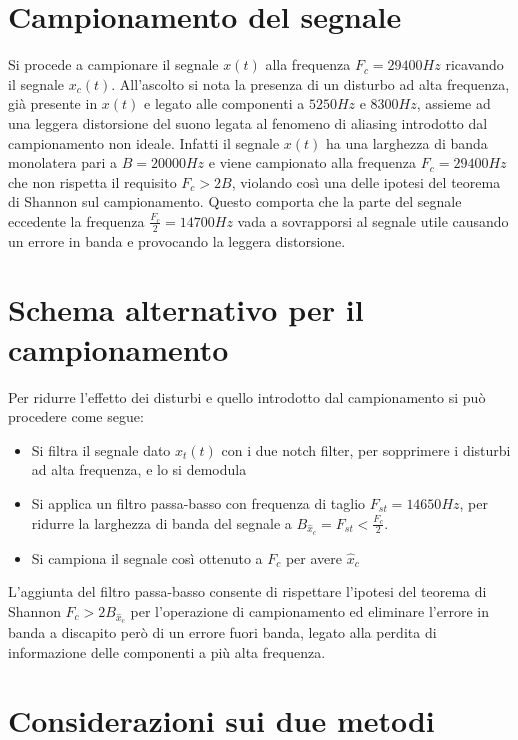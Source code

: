 \documentclass[12pt]{article}
\begin{document}
\section{Campionamento del segnale}

Si procede a campionare il segnale $x(t)$ alla frequenza $F_{c} = 29400Hz$ ricavando il segnale $x_{c}(t)$. All'ascolto si nota la presenza di un disturbo ad alta frequenza, già presente in $x(t)$ e legato alle componenti a $5250Hz$ e $8300Hz$, assieme ad una leggera distorsione del suono legata al fenomeno di aliasing introdotto dal campionamento non ideale. Infatti il segnale $x(t)$ ha una larghezza di banda monolatera pari a $B = 20000Hz$ e viene campionato alla frequenza $F_{c} = 29400Hz$ che non rispetta il requisito $F_{c} > 2B$, violando così una delle ipotesi del teorema di Shannon sul campionamento. Questo comporta che la parte del segnale eccedente la frequenza $\frac{F_{c}}{2} = 14700Hz$ vada a sovrapporsi al segnale utile causando un errore in banda e provocando la leggera distorsione.

\section{Schema alternativo per il campionamento}

Per ridurre l'effetto dei disturbi e quello introdotto dal campionamento si può procedere come segue: 
\begin{itemize}
	\item Si filtra il segnale dato $x_{t}(t)$ con i due notch filter, per sopprimere i disturbi ad alta frequenza, e lo si demodula 
	\item Si applica un filtro passa-basso con frequenza di taglio $F_{st} = 14650Hz$, per ridurre la larghezza di banda del segnale a $B_{\hat{x}_{c}} = F_{st} < \frac{F_{c}}{2}$.  
	\item Si campiona il segnale così ottenuto a $F_{c}$ per avere $\hat{x}_{c}$
\end{itemize}

L'aggiunta del filtro passa-basso consente di rispettare l'ipotesi del teorema di Shannon $F_{c} > 2 B_{\hat{x}_{c}}$ per l'operazione di campionamento ed eliminare l'errore in banda a discapito però di un errore fuori banda, legato alla perdita di informazione delle componenti a più alta frequenza.

\section{Considerazioni sui due metodi}
\end{document}
